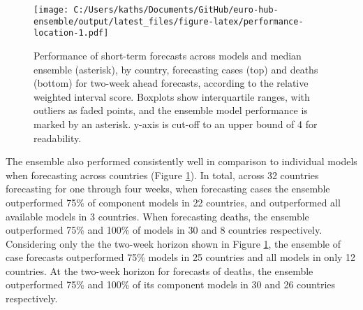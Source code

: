 \documentclass[
]{article}
\begin{document}
\begin{figure}
\centering
\texttt{[image: C:/Users/kaths/Documents/GitHub/euro-hub-ensemble/output/latest\_files/figure-latex/performance-location-1.pdf]}
\caption{\label{fig:performance-location}Performance of short-term forecasts across models and
median ensemble (asterisk), by country, forecasting cases (top) and deaths (bottom) for two-week ahead forecasts, according to the relative weighted interval score. Boxplots show interquartile ranges, with outliers as faded points, and the ensemble model performance is marked by an asterisk. y-axis is cut-off to an upper bound of 4 for readability.}
\end{figure}

The ensemble also performed consistently well in comparison to individual models when forecasting across countries (Figure \ref{fig:performance-location}). In total, across 32 countries forecasting for one through four weeks, when forecasting cases the ensemble outperformed 75\% of component models in 22 countries, and outperformed all available models in 3 countries. When forecasting deaths, the ensemble outperformed 75\% and 100\% of models in 30 and 8 countries respectively. Considering only the the two-week horizon shown in Figure \ref{fig:performance-location}, the ensemble of case forecasts outperformed 75\% models in 25 countries and all models in only 12 countries. At the two-week horizon for forecasts of deaths, the ensemble outperformed 75\% and 100\% of its component models in 30 and 26 countries respectively.
\end{document}
